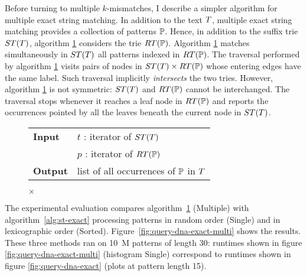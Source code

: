 Before turning to multiple $k$-mismatches, I describe a simpler algorithm for multiple exact string matching.
In addition to the text $T$, multiple exact string matching provides a collection of patterns $\mathbb{P}$.
Hence, in addition to the suffix trie $ST(T)$, algorithm \ref{alg:st-exact-multi} considers the trie $RT(\mathbb{P})$.
Algorithm \ref{alg:st-exact-multi} matches simultaneously in $ST(T)$ all patterns indexed in $RT(\mathbb{P})$.
The traversal performed by algorithm \ref{alg:st-exact-multi} visits pairs of nodes in $ST(T) \times RT(\mathbb{P})$ whose entering edges have the same label.
Such traversal implicitly \emph{intersects} the two tries.
However, algorithm \ref{alg:st-exact-multi} is not symmetric: $ST(T)$ and $RT(\mathbb{P})$ cannot be interchanged.
The traversal stops whenever it reaches a leaf node in $RT(\mathbb{P})$ and reports the occurrences pointed by all the leaves beneath the current node in $ST(T)$.

\begin{figure*}[b]
\begin{center}
\begin{minipage}[t]{.8\textwidth}
\begin{algorithm}[H]
\begin{tabular}{ll}
\textbf{Input}  & $t$ : iterator of $ST(T)$\\
 			    & $p$ : iterator of $RT(\mathbb{P})$\\
\textbf{Output} & list of all occurrences of $\mathbb{P}$ in $T$\\
\end{tabular}
\begin{algorithmic}[1]
	\State \Report {} $\times$ 
\Else
	\State {}
	\Repeat
			\State {}
			\State {}
		\EndIf
\EndIf
\end{algorithmic}
\label{alg:st-exact-multi}
\end{algorithm}
\end{minipage}
\end{center}
\end{figure*}

The experimental evaluation compares algorithm~\ref{alg:st-exact-multi} (Multiple) with algorithm~\ref{alg:st-exact} processing patterns in random order (Single) and in lexicographic order (Sorted).
Figure~\ref{fig:query-dna-exact-multi} shows the results.
These three methods ran on 10~M patterns of length 30: runtimes shown in figure \ref{fig:query-dna-exact-multi} (histogram Single) correspond to runtimes shown in figure \ref{fig:query-dna-exact} (plots at pattern length 15).

